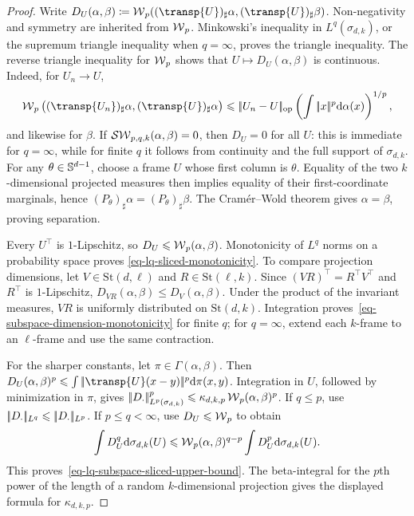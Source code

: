\begin{proof}
	Write
	$D_U(\alpha,\beta)\eqdef
	\Wass_p((\transp{U})_\sharp\alpha,(\transp{U})_\sharp\beta)$.
	Non-negativity and symmetry are inherited from $\operatorname{\mathcal{W}}_p$.
	Minkowski's inequality in $L^q(\sigma_{d,k})$, or the supremum triangle
	inequality when $q=\infty$, proves the triangle inequality. The reverse
	triangle inequality for $\operatorname{\mathcal{W}}_p$ shows that $U\mapsto D_U(\alpha,\beta)$ is
	continuous. Indeed, for $U_n\to U$,
	\[
		\Wass_p\big((\transp{U_n})_\sharp\alpha,(\transp{U})_\sharp\alpha\big)
		\leq
		\norm{U_n-U}_{\mathrm{op}}
		\left(\int\norm{x}^p\d\alpha(x)\right)^{1/p},
	\]
	and likewise for $\beta$. If $\operatorname{\mathcal{SW}}_{p,q,k}(\alpha,\beta)=0$, then $D_U=0$ for
	all $U$: this is immediate for $q=\infty$, while for finite $q$ it follows
	from continuity and the full support of $\sigma_{d,k}$. For any
	$\theta\in\mathbb{S}^{d-1}$, choose a frame $U$ whose first column is $\theta$.
	Equality of the two $k$-dimensional projected measures then implies equality
	of their first-coordinate marginals, hence
	$(P_\theta)_\sharp\alpha=(P_\theta)_\sharp\beta$. The Cram\'er--Wold theorem
	gives $\alpha=\beta$, proving separation.

	Every $U^\top$ is $1$-Lipschitz, so $D_U\leqslant\operatorname{\mathcal{W}}_p(\alpha,\beta)$.
	Monotonicity of $L^q$ norms on a probability space proves
	\eqref{eq-lq-sliced-monotonicity}. To compare projection dimensions, let
	$V\in\mathrm{St}(d,\ell)$ and $R\in\mathrm{St}(\ell,k)$. Since
	$(VR)^\top=R^\top V^\top$ and $R^\top$ is $1$-Lipschitz,
	$D_{VR}(\alpha,\beta)\leq D_V(\alpha,\beta)$. Under the product of the
	invariant measures, $VR$ is uniformly distributed on $\mathrm{St}(d,k)$.
	Integration proves~\eqref{eq-subspace-dimension-monotonicity} for finite $q$;
	for $q=\infty$, extend each $k$-frame to an $\ell$-frame and use the same
	contraction.

	For the sharper constants, let $\pi\in\Gamma(\alpha,\beta)$. Then
	$D_U(\alpha,\beta)^p \leq \int\norm{\transp{U}(x-y)}^p\d\pi(x,y)$.
	Integration in $U$, followed by minimization in $\pi$, gives
	$|\!| D_\cdot |\!|_{L^p(\sigma_{d,k})}^p
	\leqslant\kappa_{d,k,p}\operatorname{\mathcal{W}}_p(\alpha,\beta)^p$. If $q\leq p$, use
	$|\!| D_\cdot |\!|_{L^q}\leqslant|\!| D_\cdot |\!|_{L^p}$. If $p\leq q<\infty$, use
	$D_U\leqslant\operatorname{\mathcal{W}}_p$ to obtain
	\[
		\int D_U^q\mathrm{d}\sigma_{d,k}(U)
		\leqslant
		\operatorname{\mathcal{W}}_p(\alpha,\beta)^{q-p}
		\int D_U^p\mathrm{d}\sigma_{d,k}(U).
	\]
	This proves~\eqref{eq-lq-subspace-sliced-upper-bound}. The beta-integral for
	the $p$th power of the length of a random $k$-dimensional projection gives
	the displayed formula for $\kappa_{d,k,p}$.


\end{proof}
